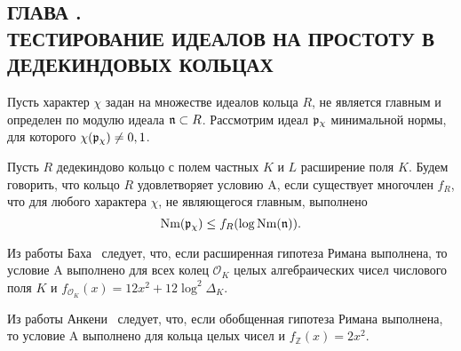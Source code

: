 \documentclass[_00_dissertation.tex]{subfiles}
\begin{document}
\onlyinsubfile{
    \renewcommand{\contentsname}{ОГЛАВЛЕНИЕ}
    \setcounter{tocdepth}{3}
    \tableofcontents
}

\newpage
\begin{center}
    \section*{ГЛАВА .\\ ТЕСТИРОВАНИЕ ИДЕАЛОВ НА ПРОСТОТУ В ДЕДЕКИНДОВЫХ КОЛЬЦАХ}\label{section:Primality}
\end{center}

\begin{definition}
    Пусть характер $\chi$ задан на множестве идеалов кольца $R$, не является главным и определен по модулю идеала $\mathfrak{n} \subset R$.
    Рассмотрим идеал $\mathfrak{p}_{\chi}$ минимальной нормы, для которого $\chi(\mathfrak{p}_{\chi}) \neq 0, 1$.

    Пусть $R$ дедекиндово кольцо с полем частных $K$ и $L$ расширение поля $K$.
    Будем говорить, что кольцо $R$ удовлетворяет условию A, если существует многочлен $f_R$, что для любого характера $\chi$, не являющегося главным, выполнено
    \begin{equation*}
        \textrm{Nm}(\mathfrak{p}_{\chi}) \le f_R(\log{\textrm{Nm}(\mathfrak{n})}).
    \end{equation*}
\end{definition}

\begin{remark}
    Из работы Баха~\cite{source:Bach} следует, что, если расширенная гипотеза Римана выполнена, то условие A выполнено для всех колец $\mathcal{O}_K$ целых алгебраических чисел числового поля $K$ и $f_{\mathcal{O}_K}(x) = 12x^2 + 12\log^2 \Delta_{K}$.
\end{remark}

\begin{remark}
    Из работы Анкени~\cite{source:Ankeny} следует, что, если обобщенная гипотеза Римана выполнена, то условие A выполнено для кольца целых чисел и $f_{\mathbb{Z}}(x) = 2x^2$.
\end{remark}
\end{document}
